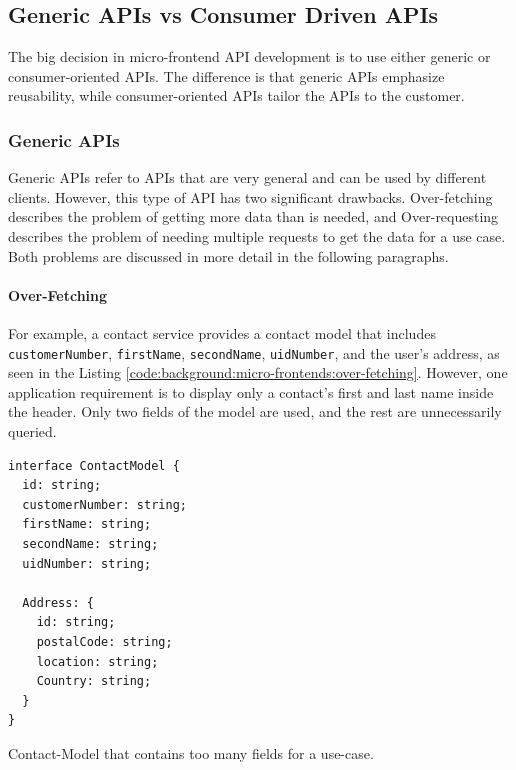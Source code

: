 \subsection{Generic APIs vs Consumer Driven APIs}\label{subsection:background:micro-frontend:generic-vs-consumer-driven-apis}

The big decision in micro-frontend \ac{API} development is to use either generic or consumer-oriented \acp{API}. The difference is that generic \acp{API} emphasize reusability, while consumer-oriented \acp{API} tailor the \acp{API} to the customer.

\subsubsection{Generic \acp{API}}\label{subsubsection:background:micro-frontend:generic-vs-consumer-driven-apis:generic-apis}

Generic \acp{API} refer to \acp{API} that are very general and can be used by different clients. However, this type of \ac{API} has two significant drawbacks. Over-fetching describes the problem of getting more data than is needed, and Over-requesting describes the problem of needing multiple requests to get the data for a use case. Both problems are discussed in more detail in the following paragraphs. \cite{misc:2019:leitner:background:micro-frontends:backend-for-frontends}

\paragraph{Over-Fetching}\label{paragraph:background:micro-frontend:generic-vs-consumer-driven-apis:generic-apis:over-fetching}

For example, a contact service provides a contact model that includes \texttt{customerNumber}, \texttt{firstName}, \texttt{secondName}, \texttt{uidNumber}, and the user's address, as seen in the Listing \ref{code:background:micro-frontends:over-fetching}. However, one application requirement is to display only a contact's first and last name inside the header. Only two fields of the model are used, and the rest are unnecessarily queried. \cite{misc:2019:leitner:background:micro-frontends:backend-for-frontends}

\ifshowListings
\begin{listing}[H]
  \begin{verbatim}
interface ContactModel {
  id: string;
  customerNumber: string;
  firstName: string;
  secondName: string;
  uidNumber: string;

  Address: {
    id: string;
    postalCode: string;
    location: string;
    Country: string;
  }
}
  \end{verbatim}
  \caption{Contact-Model that contains too many fields for a use-case.}\label{code:background:micro-frontends:over-fetching}
\end{listing}
\fi

